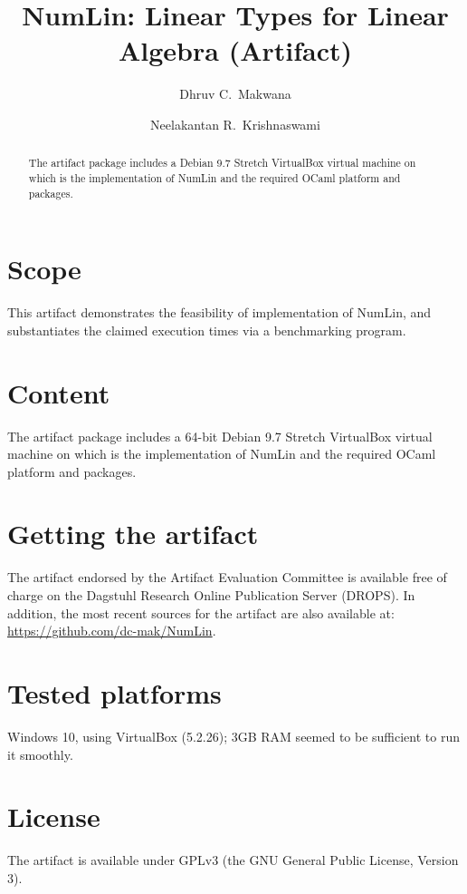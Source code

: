 \documentclass[a4paper,UKenglish]{darts-v2019}
\title{NumLin: Linear Types for Linear Algebra (Artifact)}
\author{Dhruv C.~Makwana}{Unaffiliated \url{dhruvmakwana.com} }{dcm41@cam.ac.uk}{https://orcid.org/0000-0001-7220-4991}{}
\author{Neelakantan R.~Krishnaswami}{Department of Computer Science and Technology, University of Cambridge, United Kingdom}{nk480@cl.cam.ac.uk}{https://orcid.org/0000-0003-2838-5865}{}
\newenvironment{scope}{\section{Scope}}{}
\newenvironment{content}{\section{Content}}{}
\newenvironment{getting}{\section{Getting the artifact}\label{sec:getting} The
artifact endorsed by the Artifact Evaluation Committee is available free of 
charge on the Dagstuhl Research Online Publication Server (DROPS).}{}
\newenvironment{platforms}{\section{Tested platforms}}{}
\newcommand{\license}[1]{{\section{License}#1}}
\begin{document}
\maketitle%

\begin{abstract}
The artifact package includes a Debian 9.7 Stretch VirtualBox virtual machine
on which is the implementation of NumLin and the required OCaml platform and
packages.
\end{abstract}


\begin{scope}
This artifact demonstrates the feasibility of implementation of NumLin,
and substantiates the claimed execution times via a benchmarking program.
\end{scope}

\begin{content}
The artifact package includes a 64-bit Debian 9.7 Stretch VirtualBox virtual
machine on which is the implementation of NumLin and the required OCaml
platform and packages.
\end{content}

\begin{getting}
In addition, the most recent sources for the artifact are also available at:
\url{https://github.com/dc-mak/NumLin}.
\end{getting}

\begin{platforms}
Windows 10, using VirtualBox (5.2.26); 3GB RAM seemed to be sufficient to run
it smoothly.
\end{platforms}

\license{The artifact is available under GPLv3 (the GNU General Public License,
Version 3).}
\end{document}
